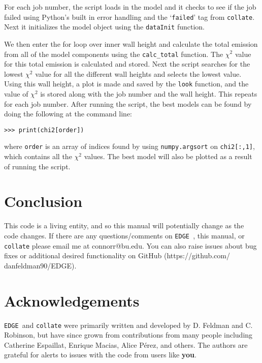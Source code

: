 \documentclass{emulateapj}
\newcommand{\edge}{\texttt{EDGE }}
\begin{document}
For each job number, the script loads in the model and it checks to see if the job failed using Python's built in error handling and the `\texttt{failed}' tag from \texttt{collate}. 
Next it initializes the model object using the \texttt{dataInit} function. 

We then enter the for loop over inner wall height and calculate the total emission from all of the model components using the \texttt{calc\_total} function. The $\chi^2$ value for this total emission is calculated and stored. Next the script searches for the lowest $\chi^2$ value for all the different wall heights and selects the lowest value. Using this wall height, a plot is made and saved by the \texttt{look} function, and the value of $\chi^2$ is stored along with the job number and the wall height. This repeats for each job number. After running the script, the best models can be found by doing the following at the command line:

\vspace{2mm}
\texttt{>>> print(chi2[order])}
\vspace{2mm}

where \texttt{order} is an array of indices found by using \texttt{numpy.argsort} on \texttt{chi2[:,1]}, which contains all the $\chi^2$ values. The best model will also be plotted as a result of running the script.


\section{Conclusion}
 
This code is a living entity, and so this manual will potentially change as the code changes. If there are any questions/comments on \edge, this manual, or \texttt{collate} please email me at connorr@bu.edu. You can also raise issues about bug fixes or additional desired functionality on GitHub (https://github.com/ danfeldman90/EDGE). 


\section{Acknowledgements}
\edge and \texttt{collate} were primarily written and developed by D. Feldman and C. Robinson, but have since grown from contributions from many people including Catherine Espaillat, Enrique Macias, Alice P\'erez, and others. The authors are grateful for alerts to issues with the code from users like \textbf{you}.
\end{document}
